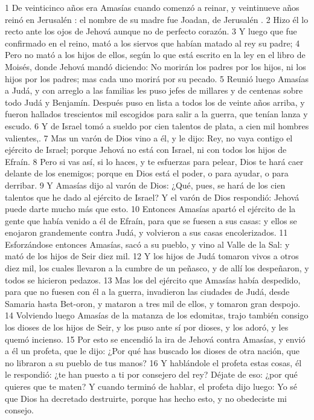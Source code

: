 1 De veinticinco años era Amasías cuando comenzó a reinar, y veintinueve años reinó en Jerusalén : el nombre de su madre fue Joadan, de Jerusalén .
2 Hizo él lo recto ante los ojos de Jehová aunque no de perfecto corazón.
3 Y luego que fue confirmado en el reino, mató a los siervos que habían matado al rey su padre;
4 Pero no mató a los hijos de ellos,  según lo que está escrito en la ley en el libro de Moisés, donde Jehová mandó diciendo: No morirán los padres por los hijos, ni los hijos por los padres; mas cada uno morirá por su pecado. 
5 Reunió luego Amasías a Judá, y con arreglo a las familias les puso jefes de millares y de centenas sobre todo Judá y Benjamín. Después puso en lista a todos los de veinte años arriba, y fueron hallados trescientos mil escogidos para salir a la guerra, que tenían lanza y escudo.
6 Y de Israel tomó a sueldo por cien talentos de plata,   a cien mil hombres valientes,.
7 Mas un varón de Dios vino a él, y le dijo: Rey, no vaya contigo el ejército de Israel; porque Jehová no está con Israel, ni con todos los hijos de Efraín.
8 Pero si vas así, si lo haces, y te esfuerzas para pelear, Dios te hará caer delante de los enemigos; porque en Dios está el poder, o para ayudar, o para derribar.
9 Y Amasías dijo al varón de Dios: ¿Qué, pues, se hará de los cien talentos   que he dado al ejército de Israel? Y el varón de Dios respondió: Jehová puede darte mucho más que esto.
10 Entonces Amasías apartó el ejército de la gente que había venido a él de Efraín, para que se fuesen a sus casas: y ellos se enojaron grandemente contra Judá, y volvieron a sus casas encolerizados.
11 Esforzándose entonces Amasías, sacó a su pueblo, y vino al Valle de la Sal: y mató de los hijos de Seir diez mil. 
12 Y los hijos de Judá tomaron vivos a otros diez mil, los cuales llevaron a la cumbre de un peñasco, y de allí los despeñaron, y todos se hicieron pedazos.
13 Mas los del ejército que Amasías había despedido, para que no fuesen con él a la guerra, invadieron las ciudades de Judá, desde Samaria hasta Bet-oron, y mataron a tres mil de ellos, y tomaron gran despojo.
14 Volviendo luego Amasías de la matanza de los edomitas, trajo también consigo los dioses de los hijos de Seir, y los puso ante sí por dioses, y los adoró, y les quemó incienso.
15 Por esto se encendió la ira de Jehová contra Amasías, y envió a él un profeta, que le dijo: ¿Por qué has buscado los dioses de otra nación, que no libraron a su pueblo de tus manos?
16 Y hablándole el profeta estas cosas, él le respondió: ¿te han puesto a ti por consejero del rey? Déjate de eso: ¿por qué quieres que te maten? Y cuando terminó de hablar, el profeta dijo luego: Yo sé que Dios ha decretado destruirte, porque has hecho esto, y no obedeciste mi consejo.
